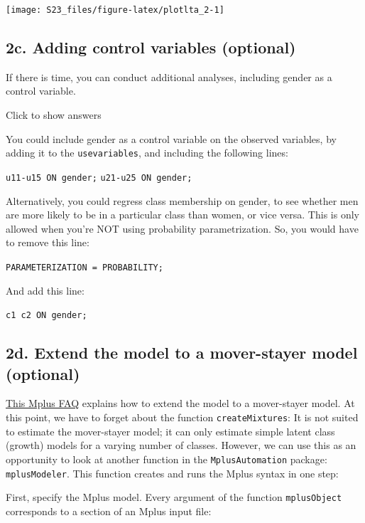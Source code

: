 \documentclass[
]{book}
\begin{document}
\begin{center}\texttt{[image: S23\_files/figure-latex/plotlta\_2-1]} \end{center}

\hypertarget{c.-adding-control-variables-optional}{%
\subsection{2c. Adding control variables (optional)}\label{c.-adding-control-variables-optional}}

If there is time, you can conduct additional analyses, including gender as a control variable.

Click to show answers

You could include gender as a control variable on the observed variables, by adding it to the \texttt{usevariables}, and including the following lines:

\texttt{u11-u15\ ON\ gender;}
\texttt{u21-u25\ ON\ gender;}

Alternatively, you could regress class membership on gender, to see whether men are more likely to be in a particular class than women, or vice versa. This is only allowed when you're NOT using probability parametrization. So, you would have to remove this line:

\texttt{PARAMETERIZATION\ =\ PROBABILITY;}

And add this line:

\texttt{c1\ c2\ ON\ gender;}

\hypertarget{d.-extend-the-model-to-a-mover-stayer-model-optional}{%
\subsection{2d. Extend the model to a mover-stayer model (optional)}\label{d.-extend-the-model-to-a-mover-stayer-model-optional}}

\href{https://www.statmodel.com/download/LTA\%20with\%20Movers-Stayers.pdf}{This Mplus FAQ} explains how to extend the model to a mover-stayer model. At this point, we have to forget about the function \texttt{createMixtures}: It is not suited to estimate the mover-stayer model; it can only estimate simple latent class (growth) models for a varying number of classes. However, we can use this as an opportunity to look at another function in the \texttt{MplusAutomation} package: \texttt{mplusModeler}. This function creates and runs the Mplus syntax in one step:

First, specify the Mplus model. Every argument of the function \texttt{mplusObject} corresponds to a section of an Mplus input file:
\end{document}
